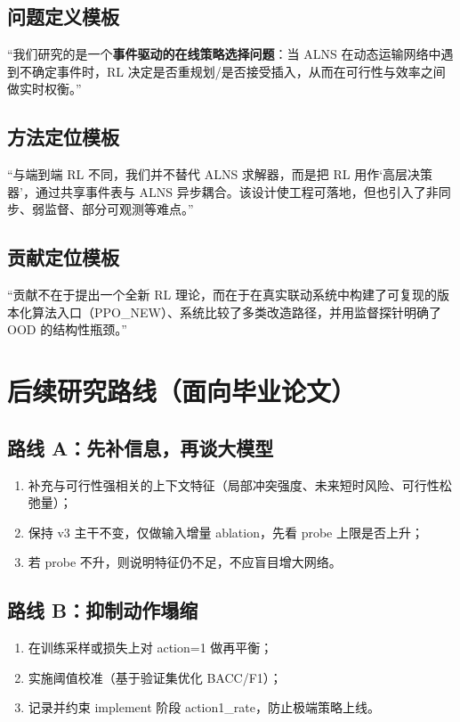 ﻿\documentclass[11pt,a4paper]{ctexart}
\begin{document}
\subsection{问题定义模板}
“我们研究的是一个\textbf{事件驱动的在线策略选择问题}：当 ALNS 在动态运输网络中遇到不确定事件时，RL 决定是否重规划/是否接受插入，从而在可行性与效率之间做实时权衡。”

\subsection{方法定位模板}
“与端到端 RL 不同，我们并不替代 ALNS 求解器，而是把 RL 用作‘高层决策器’，通过共享事件表与 ALNS 异步耦合。该设计使工程可落地，但也引入了非同步、弱监督、部分可观测等难点。”

\subsection{贡献定位模板}
“贡献不在于提出一个全新 RL 理论，而在于在真实联动系统中构建了可复现的版本化算法入口（PPO\_NEW）、系统比较了多类改造路径，并用监督探针明确了 OOD 的结构性瓶颈。”

\clearpage


\section{后续研究路线（面向毕业论文）}
\subsection{路线 A：先补信息，再谈大模型}
\begin{enumerate}[leftmargin=*]
  \item 补充与可行性强相关的上下文特征（局部冲突强度、未来短时风险、可行性松弛量）；
  \item 保持 v3 主干不变，仅做输入增量 ablation，先看 probe 上限是否上升；
  \item 若 probe 不升，则说明特征仍不足，不应盲目增大网络。
\end{enumerate}

\subsection{路线 B：抑制动作塌缩}
\begin{enumerate}[leftmargin=*]
  \item 在训练采样或损失上对 action=1 做再平衡；
  \item 实施阈值校准（基于验证集优化 BACC/F1）；
  \item 记录并约束 implement 阶段 action1\_rate，防止极端策略上线。
\end{enumerate}
\end{document}
